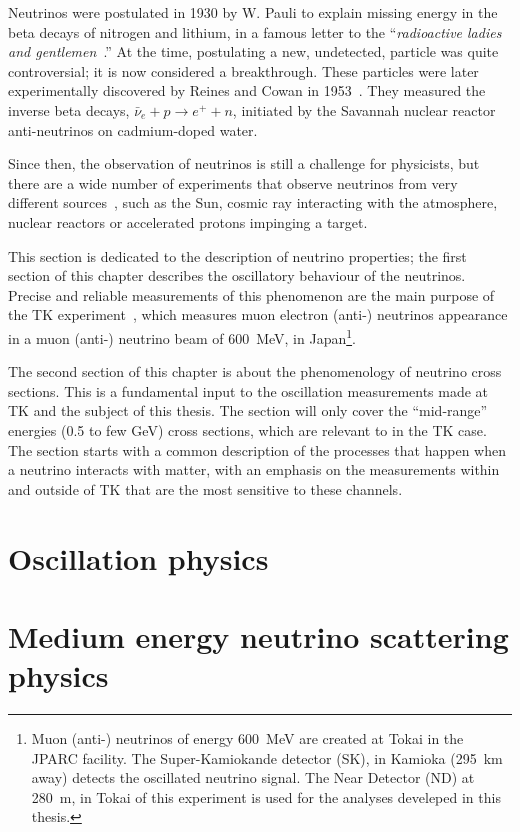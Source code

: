
Neutrinos were postulated in 1930 by W. Pauli to explain missing
energy in the beta decays of nitrogen and lithium, in a famous letter
to the ``{\it radioactive ladies and gentlemen}~\cite{Pauli1930}.''
At the time, postulating a new, undetected, particle was quite
controversial; it is now considered a breakthrough. These particles
were later experimentally discovered by Reines and Cowan in
1953~\cite{Reines1953}. They measured the inverse beta decays,
$\bar{\nu}_e+p\rightarrow e^++n$, initiated by the Savannah nuclear
reactor anti-neutrinos on cadmium-doped water.

Since then, the observation of neutrinos is still a challenge for
physicists, but there are a wide number of experiments that observe
neutrinos from very different
sources~\cite{T2K2011,SK2003,SNO2000,DayaBay2015}, such as the Sun,
cosmic ray interacting with the atmosphere, nuclear reactors or
accelerated protons impinging a target.

This section is dedicated to the description of neutrino properties;
the first section of this chapter describes the oscillatory behaviour
of the neutrinos. Precise and reliable measurements of this phenomenon
are the main purpose of the \Gls{TK} experiment~\cite{T2K2011}, which
measures muon electron (anti-) neutrinos appearance in a muon (anti-)
neutrino beam of 600~MeV, in Japan\footnote{Muon (anti-) neutrinos of
  energy 600~MeV are created at Tokai in the \Gls{JPARC} facility. The
  Super-Kamiokande detector (\Gls{SK}), in Kamioka (295~km away)
  detects the oscillated neutrino signal. The Near Detector (\Gls{ND})
  at 280~m, in Tokai of this experiment is used for the analyses
  develeped in this thesis.}.

The second section of this chapter is about the phenomenology of
neutrino cross sections. This is a fundamental input to the
oscillation measurements made at \Gls{TK} and the subject of this
thesis. The section will only cover the ``mid-range'' energies (0.5 to
few GeV) cross sections, which are relevant to in the \Gls{TK}
case. The section starts with a common description of the processes
that happen when a neutrino interacts with matter, with an emphasis on
the measurements within and outside of \Gls{TK} that are the most
sensitive to these channels.

\section{Oscillation physics}
\label{sec:oscillation}


\section{Medium energy neutrino scattering physics}
\label{sec:crosssection}

